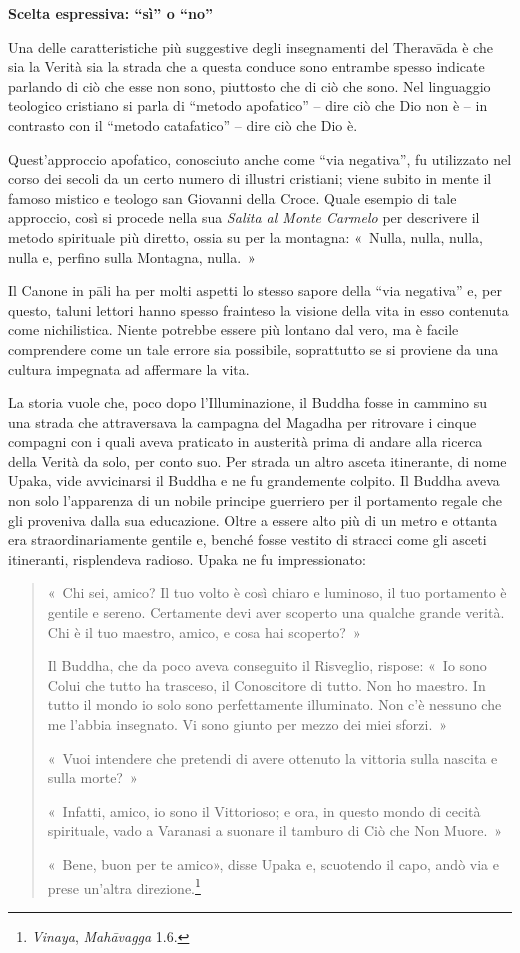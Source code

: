 \textbf{Scelta espressiva: ``sì'' o ``no''}

Una delle caratteristiche più suggestive degli insegnamenti del
Theravāda è che sia la Verità sia la strada che a questa conduce sono
entrambe spesso indicate parlando di ciò che esse non sono, piuttosto
che di ciò che sono. Nel linguaggio teologico cristiano si parla di
``metodo apofatico'' -- dire ciò che Dio non è -- in contrasto con il
``metodo catafatico'' -- dire ciò che Dio è.

Quest'approccio apofatico, conosciuto anche come ``via negativa'', fu
utilizzato nel corso dei secoli da un certo numero di illustri
cristiani; viene subito in mente il famoso mistico e teologo san
Giovanni della Croce. Quale esempio di tale approccio, così si procede
nella sua \emph{Salita al Monte Carmelo} per descrivere il metodo
spirituale più diretto, ossia su per la montagna: «~Nulla, nulla, nulla,
nulla e, perfino sulla Montagna, nulla.~»

Il Canone in pāli ha per molti aspetti lo stesso sapore della ``via
negativa'' e, per questo, taluni lettori hanno spesso frainteso la
visione della vita in esso contenuta come nichilistica. Niente potrebbe
essere più lontano dal vero, ma è facile comprendere come un tale errore
sia possibile, soprattutto se si proviene da una cultura impegnata ad
affermare la vita.

La storia vuole che, poco dopo l'Illuminazione, il Buddha fosse in
cammino su una strada che attraversava la campagna del Magadha per
ritrovare i cinque compagni con i quali aveva praticato in austerità
prima di andare alla ricerca della Verità da solo, per conto suo. Per
strada un altro asceta itinerante, di nome Upaka, vide avvicinarsi il
Buddha e ne fu grandemente colpito. Il Buddha aveva non solo
l'apparenza di un nobile principe guerriero per il portamento regale
che gli proveniva dalla sua educazione. Oltre a essere alto più di un
metro e ottanta era straordinariamente gentile e, benché fosse vestito
di stracci come gli asceti itineranti, risplendeva radioso. Upaka ne fu
impressionato:

\begin{quote}
«~Chi sei, amico? Il tuo volto è così chiaro e luminoso, il tuo
portamento è gentile e sereno. Certamente devi aver scoperto una qualche
grande verità. Chi è il tuo maestro, amico, e cosa hai scoperto?~»

Il Buddha, che da poco aveva conseguito il Risveglio, rispose: «~Io sono
Colui che tutto ha trasceso, il Conoscitore di tutto. Non ho maestro. In
tutto il mondo io solo sono perfettamente illuminato. Non c'è nessuno
che me l'abbia insegnato. Vi sono giunto per mezzo dei miei sforzi.~»

«~Vuoi intendere che pretendi di avere ottenuto la vittoria sulla
nascita e sulla morte?~»

«~Infatti, amico, io sono il Vittorioso; e ora, in questo mondo di
cecità spirituale, vado a Varanasi a suonare il tamburo di Ciò che Non
Muore.~»

«~Bene, buon per te amico», disse Upaka e, scuotendo il capo, andò via e
prese un'altra direzione.\footnote{\emph{Vinaya}, \emph{Mahāvagga} 1.6.}
\end{quote}

